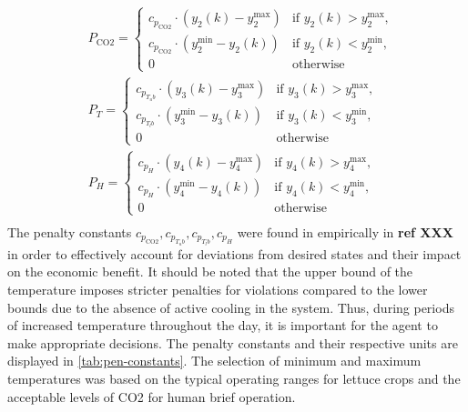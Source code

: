 \begin{equation}
\begin{aligned}
& P_{\text{CO2}} = 
\begin{cases} 
c_{p_{\text{CO2}}} \cdot (y_2(k) - y_2^{\text{max}}) & \text{if } y_2(k) > y_2^{\text{max}} , \\
c_{p_{\text{CO2}}} \cdot (y_2^{\text{min}} - y_2(k)) & \text{if } y_2(k) < y_2^{\text{min}} , \\
0 & \text{otherwise}
\end{cases}
\\
& P_{T} = 
\begin{cases} 
c_{p_{T_ub}} \cdot (y_3(k) - y_3^{\text{max}}) & \text{if } y_3(k) > y_3^{\text{max}} , \\
c_{p_{T_lb}} \cdot (y_3^{\text{min}} - y_3(k)) & \text{if } y_3(k) < y_3^{\text{min}} , \\
0 & \text{otherwise}
\end{cases}
\\
& P_{H} = 
\begin{cases} 
c_{p_{H}} \cdot (y_4(k) - y_4^{\text{max}}) & \text{if } y_4(k) > y_4^{\text{max}} , \\
c_{p_{H}} \cdot (y_4^{\text{min}} - y_4(k)) & \text{if } y_4(k) < y_4^{\text{min}} , \\
0 & \text{otherwise}
\end{cases}
\\
\end{aligned}
\end{equation}
The penalty constants $c_{p_{\text{CO2}}},c_{p_{T_ub}},c_{p_{T_lb}},c_{p_{H}}$ were found in empirically in \textbf{ref XXX} in order to effectively account for deviations from desired states and their impact on the economic benefit. It should be noted that the upper bound of the temperature  imposes stricter penalties for violations compared to the lower bounds due to the absence of active cooling in the system.  Thus, during periods of increased temperature throughout the day, it is important for the agent to make appropriate decisions. The penalty constants and their respective units are displayed in \autoref{tab:pen-constants}. The selection of minimum and maximum temperatures was based on the typical operating ranges for lettuce crops and the acceptable levels of CO2 for human brief operation.

